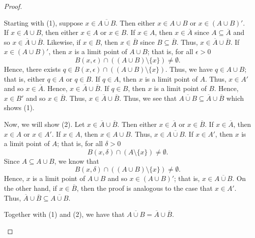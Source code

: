 \documentclass[a4paper]{article}
\begin{document}
\begin{proof}
\begin{enumerate}
    Starting with (1), suppose \( x \in \overline{A \cup B} \). Then either \( x \in A \cup B  \) or \( x \in (A \cup B)' \). If \( x \in A \cup B   \), then either \( x \in A  \) or \(  x \in B  \). If \( x \in A  \), then \( x \in \overline{A}  \) since \( A \subseteq \overline{A}     \) and so \( x \in \overline{A} \cup \overline{B} \). Likewise, if \( x \in B  \), then \( x \in \overline{B} \) since \( B \subseteq  \overline{B} \). Thus, \( x \in \overline{A} \cup \overline{B} \). If \( x \in (A \cup B)' \), then \( x  \) is a limit point of \( A \cup B  \); that is, for all \( \epsilon > 0  \) 
    \[ B(x,\epsilon) \cap ((A \cup B) \setminus  \{ x \} ) \neq \emptyset. \]
    Hence, there exists \( q \in B(x,\epsilon) \cap ((A \cup B) \setminus  \{ x \} ) \). Thus, we have \( q \in A \cup B  \); that is, either \( q \in A  \) or \( q \in B  \). If \( q \in A  \), then \( x  \) is a limit point of \( A  \). Thus, \( x \in A' \) and so \( x \in \overline{A} \). Hence, \( x \in \overline{A} \cup \overline{B} \). If \( q \in B  \), then \( x  \) is a limit point of \( B \). Hence, \( x \in B' \) and so \( x \in \overline{B} \). Thus, \( x \in \overline{A} \cup \overline{B} \). Thus, we see that \( \overline{A \cup B} \subseteq \overline{A} \cup \overline{B} \) which shows (1). 

    Now, we will show (2). Let \( x \in \overline{A} \cup \overline{B} \). Then either \( x \in \overline{A} \) or \( x \in \overline{B} \). If \( x \in \overline{A} \), then \( x \in A  \) or \( x \in A' \). If \( x \in A  \), then \( x \in A \cup B  \). Thus, \( x \in \overline{A \cup B} \). If \( x \in A'  \), then \( x  \) is a limit point of \( A  \); that is, for all \( \delta > 0 \) 
    \[  B(x,\delta) \cap (A \setminus \{ x \}   ) \neq \emptyset. \]
    Since \( A \subseteq  A \cup B   \), we know that
    \[  B(x,\delta) \cap ((A \cup B) \setminus  \{ x \} ) \neq \emptyset. \]
    Hence, \( x  \) is a limit point of \( A \cup B  \) and so \( x \in (A \cup B)' \); that is, \( x \in \overline{A \cup B} \). On the other hand, if \(  x \in \overline{B} \), then the proof is analogous to the case that \( x \in A' \). Thus, \( \overline{A} \cup \overline{B} \subseteq  \overline{A \cup B} \).

    Together with (1) and (2), we have that \( \overline{A \cup B} = \overline{A} \cup \overline{B}  \).
\end{enumerate} 
\end{proof}
\end{document}
